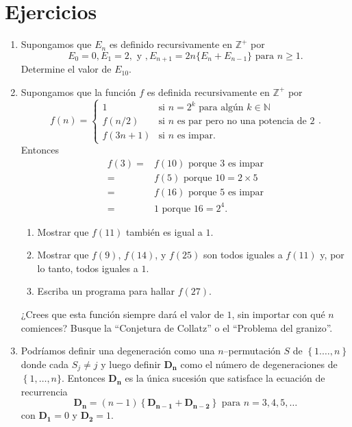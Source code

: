 \section{Ejercicios}
\begin{enumerate}
	\item Supongamos que $E_n$ es definido recursivamente en $\mathds{Z}^+$ por \[ E_0=0,E_1=2,\text{ y },E_{n+1}=2n\{E_n+E_{n-1}\} \text{ para }n\geq 1. \] Determine el valor de $E_{10}$.
	\item Supongamos que la función $f$ es definida recursivamente en $\mathds{Z}^+$ por \[ f(n)=\begin{cases}1 & \text{si }n=2^k\text{ para algún }k \in \mathds{N}\\ f(n/2) & \text{si }n\text{ es par pero no una potencia de 2} \\ f(3n+1) & \text{si }n\text{ es impar.}\end{cases}. \] Entonces 
		\begin{align*}
		f(3)=&f(10)\text{ porque }3\text{ es impar}\\
				=&f(5)\text{ porque } 10=2\times 5\\
				=&f(16)\text{ porque }5\text{ es impar}\\
				=&1\text{ porque } 16=2^4.
		\end{align*}
		\begin{enumerate}
	    \item Mostrar que $f(11)$ también es igual a $1$.
	    \item Mostrar que $f(9)$, $f(14)$, y $f(25)$ son todos iguales a $f(11)$ y, por lo tanto, todos iguales a $1$.
	    \item Escriba un programa para hallar $f(27)$.
		\end{enumerate}
	¿Crees que esta función siempre dará el valor de $1$, sin importar con qué $n$ comiences? Busque la ``Conjetura de Collatz'' o el ``Problema del granizo''.
	\item Podríamos definir una degeneración como una $n$--permutación $S$ de $\left\{1.\ldots,n\right\}$ donde cada $S_j\neq j$ y luego definir $\bm{D_n}$ como el número de degeneraciones de $\left\{1,\ldots,n\}$. Entonces $\bm{D_n}$ es la única sucesión  que satisface la ecuación de recurrencia
		\begin{equation}\label{eq1}
			\bm{D_n}=\left(n-1\right)\left\{\bm{D_{n-1}}+\bm{D_{n-2}}\right\}\text{ para }n=3,4,5,\ldots    
    \end{equation}
    con $\bm{D_1}=0$ y $\bm{D_2}=1$.
			\begin{enumerate}

\end{enumerate}
\end{enumerate}
